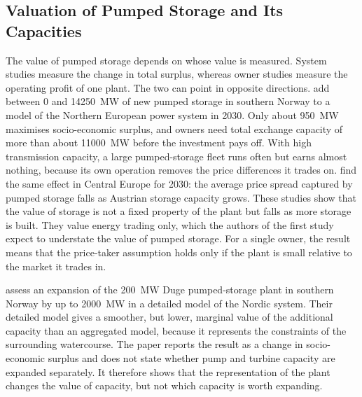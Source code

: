 
\subsection{Valuation of Pumped Storage and Its Capacities}
\label{sec:lit_valuation}

The value of pumped storage depends on whose value is measured. System
studies measure the change in total surplus, whereas owner studies
measure the operating profit of one plant. The two can point in opposite
directions. \citet{henden2016economic} add between 0 and
\SI{14250}{\mega\watt} of new pumped storage in southern Norway to a
model of the Northern European power system in 2030. Only about
\SI{950}{\mega\watt} maximises socio-economic surplus, and owners need
total exchange capacity of more than about \SI{11000}{\mega\watt}
before the investment pays off. With high transmission capacity, a large pumped-storage
fleet runs often but earns almost nothing, because its own operation
removes the price differences it trades on. \citet{dallinger2019socioeconomic}
find the same effect in Central Europe for 2030: the average price spread
captured by pumped storage falls as Austrian storage capacity grows.
These studies show that the value of storage is not a fixed property of
the plant but falls as more storage is built. They value energy trading
only, which the authors of the first study expect to understate the
value of pumped storage. For a single owner, the result means that the
price-taker assumption holds only if the plant is small relative to the
market it trades in.

\citet{helseth2017} assess an expansion of the \SI{200}{\mega\watt} Duge
pumped-storage plant in southern Norway by up to \SI{2000}{\mega\watt}
in a detailed model of the Nordic system. Their detailed model gives a
smoother, but lower, marginal value of the additional capacity than an
aggregated model, because it represents the constraints of the
surrounding watercourse. The paper reports the result as a change in
socio-economic surplus and does not state whether pump and turbine
capacity are expanded separately. It therefore shows that the
representation of the plant changes the value of capacity, but not which
capacity is worth expanding.

